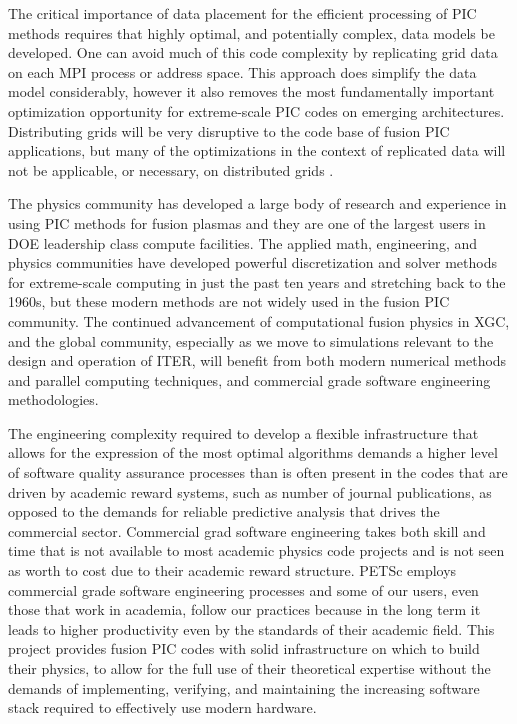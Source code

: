 \documentclass[review]{siamart}
\begin{document}
The critical importance of data placement for the efficient processing of PIC methods requires that highly optimal, and potentially complex, data models be developed.
One can avoid much of this code complexity by replicating grid data on each MPI process or address space.
This approach does simplify the data model considerably, however it also removes the most fundamentally important optimization opportunity for extreme-scale PIC codes on emerging architectures.
Distributing grids will be very disruptive to the code base of fusion PIC applications, but many of the optimizations in the context of replicated data will not be applicable, or necessary, on distributed grids \cite{Adams-07a}.

The physics community has developed a large body of research and experience in using PIC methods for fusion plasmas and they are one of the largest users in DOE leadership class compute facilities.
The applied math, engineering, and physics communities have developed powerful discretization and solver methods for extreme-scale computing in just the past ten years and stretching back to the 1960s, but these modern methods are not widely used in the fusion PIC community.
The continued advancement of computational fusion physics in XGC, and the global community, especially as we move to simulations relevant to the design and operation of ITER, will benefit from both modern numerical methods and parallel computing techniques, and commercial grade software engineering methodologies.

The engineering complexity required to develop a flexible infrastructure that allows for the expression of the most optimal algorithms demands a higher level of software quality assurance processes than is often present in the codes that are driven by academic reward systems, such as number of journal publications, as opposed to the demands for reliable predictive analysis that drives the commercial sector.
Commercial grad software engineering takes both skill and time that is not available to most academic physics code projects and is not seen as worth to cost due to their academic reward structure.
PETSc employs commercial grade software engineering processes and some of our users, even those that work in academia, follow our practices because in the long term it leads to higher productivity even by the standards of their academic field. 
This project provides fusion PIC codes with solid infrastructure on which to build their physics, to allow for the full use of their theoretical expertise without the demands of implementing, verifying, and maintaining the increasing software stack required to effectively use modern hardware.
\end{document}

